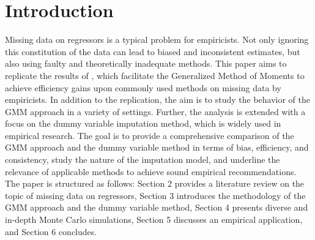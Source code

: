 \section{Introduction}
Missing data on regressors is a typical problem for empiricists.
Not only ignoring this constitution of the data can lead to biased and inconsistent estimates, but also using faulty and theoretically inadequate methods.
This paper aims to replicate the results of \cite{abrevaya2017}, which facilitate the Generalized Method of Moments to achieve efficiency gains upon commonly used methods on missing data by empiricists.
In addition to the replication, the aim is to study the behavior of the GMM approach in a variety of settings.
Further, the analysis is extended with a focus on the dummy variable imputation method, which is widely used in empirical research.
The goal is to provide a comprehensive comparison of the GMM approach and the dummy variable method in terms of bias, efficiency, and consistency, study the nature of the imputation model, and underline the relevance of applicable methods to achieve sound empirical recommendations.
The paper is structured as follows: Section 2 provides a literature review on the topic of missing data on regressors, Section 3 introduces the methodology of the GMM approach and the dummy variable method,
Section 4 presents diverse and in-depth Monte Carlo simulations, Section 5 discusses an empirical application, and Section 6 concludes.
